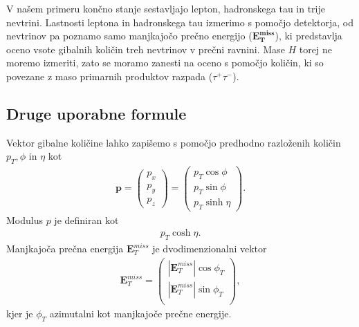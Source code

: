 \documentclass[11pt,a4paper,openany]{book}
\begin{document}
V našem primeru končno stanje sestavljajo lepton, hadronskega tau in trije nevtrini. Lastnosti leptona in hadronskega tau izmerimo s pomočjo detektorja, od nevtrinov pa poznamo samo manjkajočo prečno energijo ($\mathbf{E^{miss}_T}$), ki predstavlja oceno vsote gibalnih količin treh nevtrinov v prečni ravnini. Mase $H$ torej ne moremo izmeriti, zato se moramo zanesti na oceno s pomočjo količin, ki so povezane z maso primarnih produktov razpada ($\tau^+\tau^-$).

\subsection{Druge uporabne formule}

Vektor gibalne količine lahko zapišemo s pomočjo predhodno razloženih količin $p_T, \phi$ in $\eta$ kot
\begin{eqnarray}
	\mathbf{p} = \left( 
		\begin{array}{c}
			p_x \\
			p_y \\
			p_z 
		\end{array}
	\right) = \left(
		\begin{array}{c}
			p_T \cos \phi \\
			p_T \sin \phi \\
			p_T \sinh \eta
		\end{array}
	\right).
	\label{eq:momentum}
\end{eqnarray}
Modulus $p$ je definiran kot
\begin{eqnarray}
	p_T \cosh \eta.
	\label{eq:modulus}
\end{eqnarray}
Manjkajoča prečna energija $\mathbf{E}^{miss}_T$ je dvodimenzionalni vektor
\begin{eqnarray}
	\mathbf{E}^{miss}_T = \left(
		\begin{array}{c}
			|\mathbf{E}^{miss}_T| \cos \phi_T \\
			|\mathbf{E}^{miss}_T| \sin \phi_T \\
		\end{array}
	\right),
	\label{eq:emisst}
\end{eqnarray}
kjer je $\phi_T$ azimutalni kot manjkajoče prečne energije.
\end{document}

